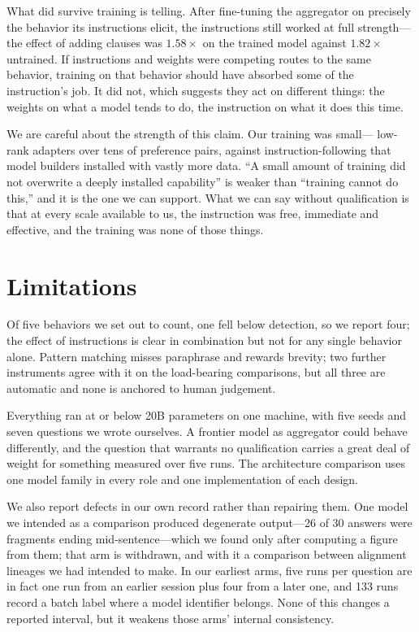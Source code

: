 \documentclass[11pt]{article}
\begin{document}
What did survive training is telling. After fine-tuning the aggregator on
precisely the behavior its instructions elicit, the instructions still worked
at full strength---the effect of adding clauses was $1.58\times$ on the
trained model against $1.82\times$ untrained. If instructions and weights were
competing routes to the same behavior, training on that behavior should have
absorbed some of the instruction's job. It did not, which suggests they act on
different things: the weights on what a model tends to do, the instruction on
what it does this time.

We are careful about the strength of this claim. Our training was small---
low-rank adapters over tens of preference pairs, against instruction-following
that model builders installed with vastly more data. ``A small amount of
training did not overwrite a deeply installed capability'' is weaker than
``training cannot do this,'' and it is the one we can support. What we can say
without qualification is that at every scale available to us, the instruction
was free, immediate and effective, and the training was none of those things.

\section{Limitations}
Of five behaviors we set out to count, one fell below detection, so we report
four; the effect of instructions is clear in combination but not for any
single behavior alone. Pattern matching misses paraphrase and rewards brevity;
two further instruments agree with it on the load-bearing comparisons, but all
three are automatic and none is anchored to human judgement.

Everything ran at or below 20B parameters on one machine, with five seeds and
seven questions we wrote ourselves. A frontier model as aggregator could
behave differently, and the question that warrants no qualification carries a
great deal of weight for something measured over five runs. The architecture
comparison uses one model family in every role and one implementation of each
design.

We also report defects in our own record rather than repairing them. One model
we intended as a comparison produced degenerate output---26 of 30 answers were
fragments ending mid-sentence---which we found only after computing a figure
from them; that arm is withdrawn, and with it a comparison between alignment
lineages we had intended to make. In our earliest arms, five runs per question
are in fact one run from an earlier session plus four from a later one, and
133 runs record a batch label where a model identifier belongs. None of this
changes a reported interval, but it weakens those arms' internal consistency.
\end{document}
